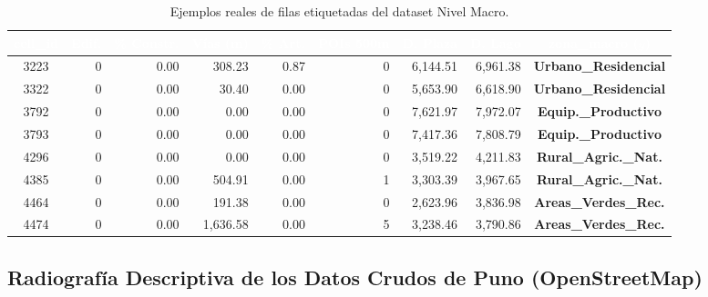 \documentclass[11pt,a4paper]{article}
\begin{document}
\begin{table}[H]
    \centering
    \caption{Ejemplos reales de filas etiquetadas del dataset Nivel Macro.}
    \label{tab:muestra_macro_real}
    \setlength{\tabcolsep}{4pt}
    \footnotesize
    \begin{adjustbox}{max width=\textwidth}
    \begin{tabular}{crrrrrrrc}
        \toprule
        \rowcolor{verdeHeader}
        \textcolor{white}{\textbf{cell\_id}} & \textcolor{white}{\textbf{Edif.}} & \textcolor{white}{\textbf{\% Constr.}} & \textcolor{white}{\textbf{Vías (m)}} & \textcolor{white}{\textbf{\% Art.}} & \textcolor{white}{\textbf{POIs 500m}} & \textcolor{white}{\textbf{D. Plaza}} & \textcolor{white}{\textbf{D. Lago}} & \textcolor{white}{\textbf{zona\_macro ($y$)}} \\
        \midrule
        3223 & 0 & 0.00 & 308.23 & 0.87 & 0 & 6{,}144.51 & 6{,}961.38 & \cellcolor{azulSuave}\textbf{Urbano\_Residencial} \\
        3322 & 0 & 0.00 & 30.40 & 0.00 & 0 & 5{,}653.90 & 6{,}618.90 & \cellcolor{azulSuave}\textbf{Urbano\_Residencial} \\
        3792 & 0 & 0.00 & 0.00 & 0.00 & 0 & 7{,}621.97 & 7{,}972.07 & \cellcolor{azulSuave}\textbf{Equip.\_Productivo} \\
        3793 & 0 & 0.00 & 0.00 & 0.00 & 0 & 7{,}417.36 & 7{,}808.79 & \cellcolor{azulSuave}\textbf{Equip.\_Productivo} \\
        4296 & 0 & 0.00 & 0.00 & 0.00 & 0 & 3{,}519.22 & 4{,}211.83 & \cellcolor{azulSuave}\textbf{Rural\_Agric.\_Nat.} \\
        4385 & 0 & 0.00 & 504.91 & 0.00 & 1 & 3{,}303.39 & 3{,}967.65 & \cellcolor{azulSuave}\textbf{Rural\_Agric.\_Nat.} \\
        4464 & 0 & 0.00 & 191.38 & 0.00 & 0 & 2{,}623.96 & 3{,}836.98 & \cellcolor{azulSuave}\textbf{Areas\_Verdes\_Rec.} \\
        4474 & 0 & 0.00 & 1{,}636.58 & 0.00 & 5 & 3{,}238.46 & 3{,}790.86 & \cellcolor{azulSuave}\textbf{Areas\_Verdes\_Rec.} \\
        \bottomrule
    \end{tabular}
    \end{adjustbox}
\end{table}

\subsection{Radiografía Descriptiva de los Datos Crudos de Puno (OpenStreetMap)}
\end{document}
